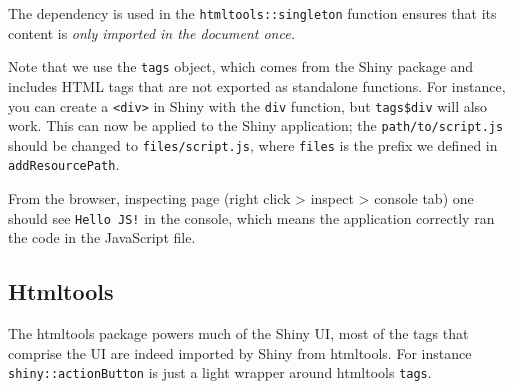 \documentclass[10pt,]{krantz}
\makeatletter
\newenvironment{Shaded}{\begin{snugshade}}{\end{snugshade}}
\newcommand{\CommentTok}[1]{\textcolor[rgb]{0.37,0.37,0.37}{\textit{#1}}}
\newcommand{\ControlFlowTok}[1]{\textcolor[rgb]{0.27,0.27,0.27}{\textbf{#1}}}
\newcommand{\DataTypeTok}[1]{\textcolor[rgb]{0.27,0.27,0.27}{#1}}
\newcommand{\KeywordTok}[1]{\textcolor[rgb]{0.27,0.27,0.27}{\textbf{#1}}}
\newcommand{\NormalTok}[1]{#1}
\newcommand{\OperatorTok}[1]{\textcolor[rgb]{0.43,0.43,0.43}{\textbf{#1}}}
\newcommand{\StringTok}[1]{\textcolor[rgb]{0.5,0.5,0.5}{#1}}
\newenvironment{kframe}{%
\medskip{}
\setlength{\fboxsep}{.8em}
 \def\at@end@of@kframe{}%
 \ifinner\ifhmode%
  \def\at@end@of@kframe{\end{minipage}}%
  \begin{minipage}{\columnwidth}%
 \fi\fi%
 \def\FrameCommand##1{\hskip\@totalleftmargin \hskip-\fboxsep
 \colorbox{shadecolor}{##1}\hskip-\fboxsep
     \hskip-\linewidth \hskip-\@totalleftmargin \hskip\columnwidth}%
 \MakeFramed {\advance\hsize-\width
   \@totalleftmargin\z@ \linewidth\hsize
   \@setminipage}}%
 {\par\unskip\endMakeFramed%
 \at@end@of@kframe}
\renewenvironment{Shaded}{\begin{kframe}}{\end{kframe}}
\makeatother
\begin{document}
The dependency is used in the \texttt{htmltools::singleton} function ensures that its content is \emph{only imported in the document once.}

Note that we use the \texttt{tags} object, which comes from the Shiny package and includes HTML tags that are not exported as standalone functions. For instance, you can create a \texttt{\textless{}div\textgreater{}} in Shiny with the \texttt{div} function, but \texttt{tags\$div} will also work. This can now be applied to the Shiny application; the \texttt{path/to/script.js} should be changed to \texttt{files/script.js}, where \texttt{files} is the prefix we defined in \texttt{addResourcePath}.

\begin{Shaded}
\end{Shaded}

From the browser, inspecting page (right click \textgreater{} inspect \textgreater{} console tab) one should see \texttt{Hello\ JS!} in the console, which means the application correctly ran the code in the JavaScript file.

\hypertarget{basics-htmltools}{%
\subsection{Htmltools}\label{basics-htmltools}}

The htmltools package powers much of the Shiny UI, most of the tags that comprise the UI are indeed imported by Shiny from htmltools. For instance \texttt{shiny::actionButton} is just a light wrapper around htmltools \texttt{tags}.
\end{document}
